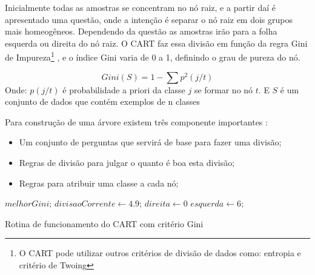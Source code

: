 Inicialmente todas as amostras se concentram no nó raiz, e a partir daí é apresentado uma questão, onde a intenção é separar o nó raiz em dois grupos mais homeogêneos. Dependendo da questão as amostras irão para a folha esquerda ou direita do nó raiz. O CART faz essa divisão em função da regra Gini de Impureza\footnote{O CART pode utilizar outros critérios de divisão de dados como: entropia e critério de Twoing} \cite{braiman1984}, e o índice Gini varia de 0 a 1, definindo o grau de pureza do nó. 

\begin{equation}
Gini(S)= 1 - \sum p^2(j/t)
 \label{eq:cartGini}
\end{equation}
Onde: ${p(j/t)}$ é probabilidade a priori da classe ${j}$ se formar no nó ${t}$. E ${S}$ é um conjunto de dados que contém exemplos de n classes

Para construção de uma árvore existem três componente importantes \cite{yohannes1999classification}: 
\begin{itemize}
[noitemsep]
 \item Um conjunto de perguntas que servirá de base para fazer uma divisão;
 \item Regras de divisão para julgar o quanto é boa esta divisão;
 \item Regras para atribuir uma classe a cada nó;
\end{itemize}



\IncMargin{1em}
\begin{algorithm}[h!]

\nl $melhorGini$; 
\nl $divisaoCorrente \leftarrow 4.9$; 
\nl $direita \leftarrow 0$\; 
\nl $esquerda \leftarrow 6$; 
\nl {}
 \caption{Rotina de funcionamento do CART com critério Gini \cite{Raimundo2008} }\label{alg:gini}
 
\end{algorithm}
\DecMargin{1em}


